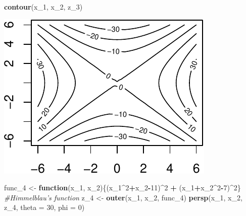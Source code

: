 \documentclass[11pt,]{article}
\newenvironment{Shaded}{\begin{snugshade}}{\end{snugshade}}
\newcommand{\KeywordTok}[1]{\textcolor[rgb]{0.13,0.29,0.53}{\textbf{#1}}}
\newcommand{\DataTypeTok}[1]{\textcolor[rgb]{0.13,0.29,0.53}{#1}}
\newcommand{\DecValTok}[1]{\textcolor[rgb]{0.00,0.00,0.81}{#1}}
\newcommand{\StringTok}[1]{\textcolor[rgb]{0.31,0.60,0.02}{#1}}
\newcommand{\CommentTok}[1]{\textcolor[rgb]{0.56,0.35,0.01}{\textit{#1}}}
\newcommand{\ControlFlowTok}[1]{\textcolor[rgb]{0.13,0.29,0.53}{\textbf{#1}}}
\newcommand{\OperatorTok}[1]{\textcolor[rgb]{0.81,0.36,0.00}{\textbf{#1}}}
\newcommand{\NormalTok}[1]{#1}
\begin{document}
\begin{Shaded}
\begin{Highlighting}[]
\KeywordTok{contour}\NormalTok{(x_}\DecValTok{1}\NormalTok{, x_}\DecValTok{2}\NormalTok{, z_}\DecValTok{3}\NormalTok{)}
\end{Highlighting}
\end{Shaded}

\begin{center}\includegraphics{Optimization_2_files/figure-latex/level_sets-6} \end{center}

\begin{Shaded}
\begin{Highlighting}[]
\NormalTok{func_}\DecValTok{4}\NormalTok{ <-}\StringTok{ }\ControlFlowTok{function}\NormalTok{(x_}\DecValTok{1}\NormalTok{, x_}\DecValTok{2}\NormalTok{)\{(x_}\DecValTok{1}\OperatorTok{^}\DecValTok{2}\OperatorTok{+}\NormalTok{x_}\DecValTok{2}\OperatorTok{-}\DecValTok{11}\NormalTok{)}\OperatorTok{^}\DecValTok{2} \OperatorTok{+}\StringTok{ }
\StringTok{    }\NormalTok{(x_}\DecValTok{1}\OperatorTok{+}\NormalTok{x_}\DecValTok{2}\OperatorTok{^}\DecValTok{2}\OperatorTok{-}\DecValTok{7}\NormalTok{)}\OperatorTok{^}\DecValTok{2}\NormalTok{\} }\CommentTok{#Himmelblau's function}
\NormalTok{z_}\DecValTok{4}\NormalTok{ <-}\StringTok{ }\KeywordTok{outer}\NormalTok{(x_}\DecValTok{1}\NormalTok{, x_}\DecValTok{2}\NormalTok{, func_}\DecValTok{4}\NormalTok{)}
\KeywordTok{persp}\NormalTok{(x_}\DecValTok{1}\NormalTok{, x_}\DecValTok{2}\NormalTok{, z_}\DecValTok{4}\NormalTok{, }\DataTypeTok{theta =} \DecValTok{30}\NormalTok{, }\DataTypeTok{phi =} \DecValTok{0}\NormalTok{)}
\end{Highlighting}
\end{Shaded}
\end{document}
